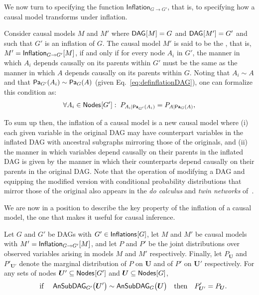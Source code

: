We now turn to specifying the function $\mathsf{Inflation}_{G\to G'}$, that is, to specifying how a causal model transforms under inflation. 

\begin{definition}
Consider causal models $M$ and $M'$ where $\SmallNamedFunction{DAG}{M}=G$ and $\SmallNamedFunction{DAG}{M'}=G'$ and such that $G'$ is an inflation of $G$.   The causal model $M'$ is said to be the {\em {}}, that is, $M' = \SmallNamedFunction[G\to G']{Inflation}{M}$,  if and only if for every node $A_i$ in $G'$, the manner in which $A_i$ depends causally on its parents within $G'$ must be the same as the manner in which $A$ depends causally on its parents within $G$.  Noting that $A_i \sim A$ and that $\Pa[G']{A_i} \sim \Pa[G]{A}$ (given Eq.~\eqref{eq:definflationDAG}), one can formalize this condition as:
\begin{align}\label{eq:funcdependences}
 \forall A_i \in \SmallNamedFunction{Nodes}{G'}:\; \pfunc{A_i| \Pa[G']{A_i}}=\pfunc{A|\Pa[G]{A}},
\end{align}
\end{definition}

To sum up then, the inflation of a causal model is a new causal model where (i) each given variable in the original DAG may have counterpart variables in the inflated DAG with ancestral subgraphs mirroring those of the originals, and (ii) the manner in which variables depend causally on their parents in the inflated DAG is given by the manner in which their counterparts depend causally on their parents in the original DAG.   Note that the operation of modifying a DAG and equipping the modified version with conditional probability distributions that mirror those of the original also appears in the \emph{do calculus} and \emph{twin networks} of~\citet{pearl2009causality}.


We are now in a position to describe the key property of the inflation of a causal model, the one that makes it useful for causal inference. 

Let $G$ and $G'$ be DAGs with $G' \in \SmallNamedFunction{Inflations}{G}$, let $M$ and $M'$ be causal models with $M' = \SmallNamedFunction[G\to G']{Inflation}{M}$, and let $P$ and $P'$ be the joint distributions over observed variables arising in models $M$ and $M'$ respectively.  Finally, let $P_{\bm{U}}$ and $P'_{\bm{U}'}$ denote the marginal distribution of $P$ on $\bm{U}$ and of $P'$ on $\bm{U}'$ respectively. For any sets of nodes $\bm{U}' \subseteq \SmallNamedFunction{Nodes}{G'}$ and   $\bm{U} \subseteq \SmallNamedFunction{Nodes}{G}$,
\begin{align}\label{eq:coincidingdistrodef}
\quad\text{if }\quad \ansubgraph[G']{\bm{U}'}\sim\ansubgraph[G]{\bm{U}} \quad\text{then}\quad P'_{\bm{U}'}=P_{\bm{U}}.
\end{align}

